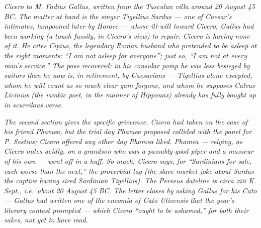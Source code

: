 
\textit{Cicero to M. Fadius Gallus, written from the Tusculan villa
around 20 August 45 BC. The matter at hand is the singer Tigellius
Sardus --- one of Caesar's intimates, lampooned later by Horace ---
whose ill-will toward Cicero, Gallus had been working (a touch
fussily, in Cicero's view) to repair. Cicero is having none of it.
He cites Cipius, the legendary Roman husband who pretended to be
asleep at the right moments: ``I am not asleep for everyone''; just
so, ``I am not at every man's service.'' The pose recovered: in
his consular pomp he was less besieged by suitors than he now is,
in retirement, by Caesarians --- Tigellius alone excepted, whom he
will count as so much clear gain forgone, and whom he supposes Calvus
Licinius (the iambic poet, in the manner of Hipponax) already has
fully bought up in scurrilous verse.}

\textit{The second section gives the specific grievance. Cicero
had taken on the case of his friend Phamea, but the trial day
Phamea proposed collided with the panel for P. Sestius; Cicero
offered any other day Phamea liked. Phamea --- relying, as Cicero
notes acidly, on a grandson who was a passably good piper and a
masseur of his own --- went off in a huff. So much, Cicero says,
for ``Sardinians for sale, each worse than the next,'' the proverbial
tag (the slave-market joke about Sardus the captive having sired
Sardinian Tigellius). The Perseus dateline is \textit{circa xiii
K. Sept.}, i.e.\ about 20 August 45 BC. The letter closes by
asking Gallus for his \textit{Cato} --- Gallus had written one of
the encomia of Cato Uticensis that the year's literary contest
prompted --- which Cicero ``ought to be ashamed,'' for both their
sakes, not yet to have read.}
